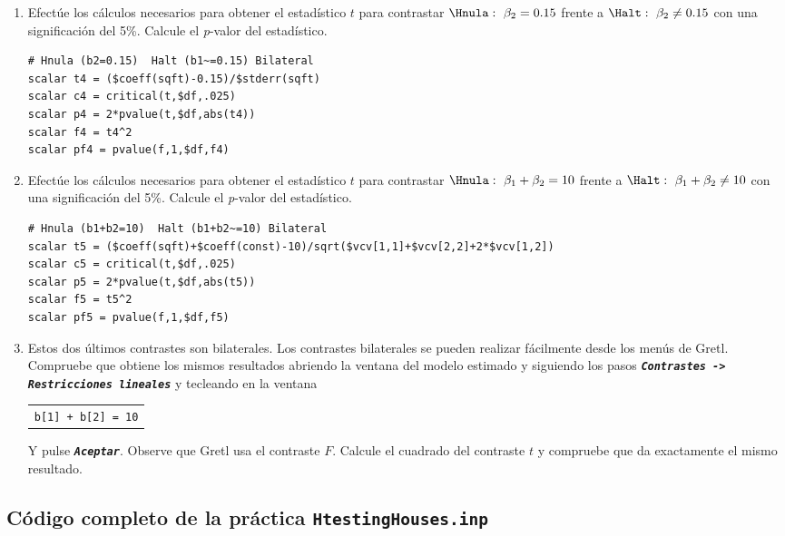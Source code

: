 \documentclass[11pt]{article}
\begin{document}
\begin{enumerate}
\item Efectúe los cálculos necesarios para obtener el estadístico \(t\)
para contrastar \(\Hnula:\ \beta_2=0.15\) frente a \(\Halt:\
   \beta_2\ne0.15\) con una significación del 5\%. Calcule el \emph{p}-valor
del estadístico.
\begin{verbatim}
# Hnula (b2=0.15)  Halt (b1~=0.15) Bilateral
scalar t4 = ($coeff(sqft)-0.15)/$stderr(sqft)
scalar c4 = critical(t,$df,.025)
scalar p4 = 2*pvalue(t,$df,abs(t4))
scalar f4 = t4^2
scalar pf4 = pvalue(f,1,$df,f4)    
\end{verbatim}

\item Efectúe los cálculos necesarios para obtener el estadístico \(t\)
para contrastar \(\Hnula:\ \beta_1+\beta_2=10\) frente a
\mbox{$\Halt:\ \beta_1+\beta_2\ne10$} con una significación del
5\%. Calcule el \emph{p}-valor del estadístico.
\begin{verbatim}
# Hnula (b1+b2=10)  Halt (b1+b2~=10) Bilateral
scalar t5 = ($coeff(sqft)+$coeff(const)-10)/sqrt($vcv[1,1]+$vcv[2,2]+2*$vcv[1,2])
scalar c5 = critical(t,$df,.025)
scalar p5 = 2*pvalue(t,$df,abs(t5))
scalar f5 = t5^2
scalar pf5 = pvalue(f,1,$df,f5)
\end{verbatim}

\item Estos dos últimos contrastes son bilaterales. Los contrastes
bilaterales se pueden realizar fácilmente desde los menús de
Gretl. Compruebe que obtiene los mismos resultados abriendo la
ventana del modelo estimado y siguiendo los pasos \textbf{\emph{\texttt{Contrastes ->
   Restricciones lineales}}} y tecleando en la ventana
\begin{center}
\begin{tabular}{l}
\texttt{b[1] + b[2] = 10}\\[0pt]
\end{tabular}
\end{center}
Y pulse \textbf{\emph{\texttt{Aceptar}}}. Observe que Gretl usa el contraste
\(F\). Calcule el cuadrado del contraste \(t\) y compruebe que da
exactamente el mismo resultado.
\end{enumerate}

\clearpage
\vspace{10pt}
\noindent
\subsection{Código completo de la práctica \texttt{HtestingHouses.inp}}
\label{sec:org5ed42d4}
\vspace{10pt}

\clearpage
\end{document}
